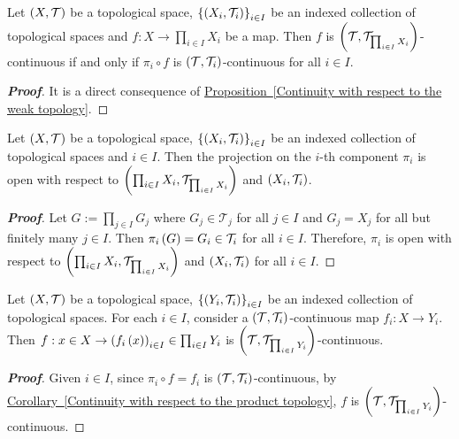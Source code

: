 \begin{corollary}\label{Continuity with respect to the product topology}
  Let $\left(X,\mathcal{T}\right)$ be a topological space, $\left\{\left(X_i,\mathcal{T}_i\right)\right\}_{i\in I}$ be an indexed collection of topological spaces and $f:X\rightarrow\prod_{i\in I}{X_i}$ be a map. Then $f$ is $\left(\mathcal{T},\mathcal{T}_{\prod_{i\in I}{X_i}}\right)$-continuous if and only if $\pi_i\circ f$ is $\left(\mathcal{T},\mathcal{T}_i\right)$-continuous for all $i\in I$.

  \begin{proof}[\rm\textbf{Proof}]
    It is a direct consequence of \hyperref[Continuity with respect to the weak topology]{Proposition~\ref*{Continuity with respect to the weak topology}}.
  \end{proof}
\end{corollary}

\begin{proposition}
  Let $\left(X,\mathcal{T}\right)$ be a topological space, $\left\{\left(X_i,\mathcal{T}_i\right)\right\}_{i\in I}$ be an indexed collection of topological spaces and $i\in I$. Then the projection on the $i$-th component $\pi_i$ is open with respect to $\left(\prod_{i\in I}{X_i},\mathcal{T}_{\prod_{i\in I}{X_i}}\right)$ and $\left(X_i,\mathcal{T}_i\right)$.
  \begin{proof}[\rm\textbf{Proof}]
    Let $G:=\prod_{j\in I}{G_j}$ where $G_j\in\mathcal{T}_j$ for all $j\in I$ and $G_j=X_j$ for all but finitely many $j\in I$. Then $\pi_i\left(G\right)=G_i\in\mathcal{T}_i$ for all $i\in I$. Therefore, $\pi_i$ is open with respect to $\left(\prod_{i\in I}{X_i},\mathcal{T}_{\prod_{i\in I}{X_i}}\right)$ and $\left(X_i,\mathcal{T}_i\right)$ for all $i\in I$.
  \end{proof}
\end{proposition}

\begin{corollary}
  Let $\left(X,\mathcal{T}\right)$ be a topological space, $\left\{\left(Y_i,\mathcal{T}_i\right)\right\}_{i\in I}$ be an indexed collection of topological spaces. For each $i\in I$, consider a $\left(\mathcal{T},\mathcal{T}_i\right)$-continuous map $f_i:X\rightarrow Y_i$. Then $f:x\in X\rightarrow\left(f_i\left(x\right)\right)_{i\in I}\in\prod_{i\in I}{Y_i}$ is $\left(\mathcal{T},\mathcal{T}_{\prod_{i\in I}{Y_i}}\right)$-continuous.
  \begin{proof}[\rm\textbf{Proof}]
    Given $i\in I$, since $\pi_i\circ f=f_i$ is $\left(\mathcal{T},\mathcal{T}_i\right)$-continuous, by \hyperref[Continuity with respect to the product topology]{Corollary~\ref*{Continuity with respect to the product topology}}, $f$ is $\left(\mathcal{T},\mathcal{T}_{\prod_{i\in I}{Y_i}}\right)$-continuous.
  \end{proof}
\end{corollary}

